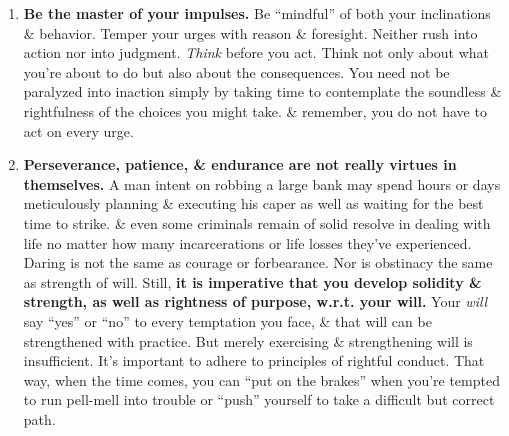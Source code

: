 \documentclass{article}
\numberwithin{equation}{section}
\begin{document}
\begin{enumerate}
	\item \textbf{Be the master of your impulses.} Be ``mindful'' of both your inclinations \& behavior. Temper your urges with reason \& foresight. Neither rush into action nor into judgment. \textit{Think} before you act. Think not only about what you're about to do but also about the consequences. You need not be paralyzed into inaction simply by taking time to contemplate the soundless \& rightfulness of the choices you might take. \& remember, you do not have to act on every urge.
	\item \textbf{Perseverance, patience, \& endurance are not really virtues in themselves.} A man intent on robbing a large bank may spend hours or days meticulously planning \& executing his caper as well as waiting for the best time to strike. \& even some criminals remain of solid resolve in dealing with life no matter how many incarcerations or life losses they've experienced. Daring is not the same as courage or forbearance. Nor is obstinacy the same as strength of will. Still, \textbf{it is imperative that you develop solidity \& strength, as well as rightness of purpose, w.r.t. your will.} Your \textit{will} say ``yes'' or ``no'' to every temptation you face, \& that will can be strengthened with practice. But merely exercising \& strengthening will is insufficient. It's important to adhere to principles of rightful conduct. That way, when the time comes, you can ``put on the brakes'' when you're tempted to run pell-mell into trouble or ``push'' yourself to take a difficult but correct path.
	

\end{enumerate}
\end{document}
